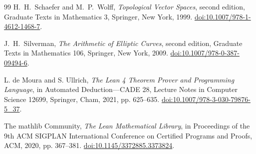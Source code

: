 \documentclass[11pt]{article}
\theoremstyle{definition}
\theoremstyle{remark}
\theoremstyle{definition}\newtheorem{example}[theorem]{Example}
\begin{document}
\begin{thebibliography}{99}
H.~H.~Schaefer and M.~P.~Wolff,
\emph{Topological Vector Spaces},
second edition, Graduate Texts in Mathematics 3,
Springer, New York, 1999.
\href{https://doi.org/10.1007/978-1-4612-1468-7}{doi:10.1007/978-1-4612-1468-7}.

J.~H.~Silverman,
\emph{The Arithmetic of Elliptic Curves},
second edition, Graduate Texts in Mathematics 106,
Springer, New York, 2009.
\href{https://doi.org/10.1007/978-0-387-09494-6}{doi:10.1007/978-0-387-09494-6}.


L. de Moura and S. Ullrich,
\emph{The Lean 4 Theorem Prover and Programming Language},
in Automated Deduction---CADE 28, Lecture Notes in Computer Science 12699,
Springer, Cham, 2021, pp. 625--635.
\href{https://doi.org/10.1007/978-3-030-79876-5_37}{doi:10.1007/978-3-030-79876-5\_37}.

The mathlib Community,
\emph{The Lean Mathematical Library},
in Proceedings of the 9th ACM SIGPLAN International Conference on Certified
Programs and Proofs, ACM, 2020, pp. 367--381.
\href{https://doi.org/10.1145/3372885.3373824}{doi:10.1145/3372885.3373824}.

\end{thebibliography}
\end{document}
